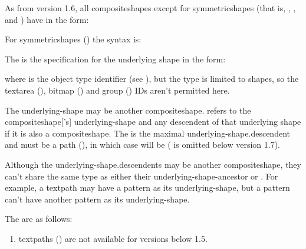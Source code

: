 \begin{numbered}
As from version 1.6, all \glspl{compositeshape} except
for \glspl{symmetricshape} (that is, 
\hyperref[jdr:textpath]{},
\hyperref[jdr:rotational]{},
\hyperref[jdr:scaled]{} and 
\hyperref[jdr:spiral]{}) have  in
the form:
\begin{syntaxline}
 
\end{syntaxline}
For \glspl{symmetricshape} (\hyperref[jdr:symmetric]{}) the syntax is:
\begin{syntaxline}
 
\end{syntaxline}

The  is the specification for the
underlying shape in the form:
\begin{syntaxline}
 
\end{syntaxline}
where  is the object type identifier (see
), but the type is limited to shapes, so the 
\gls*{textarea} (\hyperref[jdr:textarea]{}), 
\gls*{bitmap} (\hyperref[jdr:bitmap]{}) and
\gls*{group} (\hyperref[jdr:group]{}) IDs aren't permitted here.

The \gls{underlying-shape} may be another \gls{compositeshape}.
\emph{} 
refers to the \gls{compositeshape}['s]
\gls{underlying-shape} and any descendent of that underlying shape if it
is also a \gls*{compositeshape}. The
\emph{} is the
maximal \gls{underlying-shape.descendent} and must be a 
\gls*{path} (\hyperref[jdr:path]{}),
in which case   will be
   
( is omitted below version 1.7).

Although the \glspl{underlying-shape.descendent} may be another
\gls*{compositeshape}, they can't share the same type as either
their \gls{underlying-shape-ancestor} or
. For example, a
\gls{textpath} may have a \gls{pattern} as its \gls{underlying-shape}, but
a pattern can't have another pattern as its \gls{underlying-shape}.

The  are as follows:

  \begin{enumerate}%
  \item\label{jdr:textpath}%
  \Glspl{textpath} () are not available for versions below 1.5.


\end{enumerate}
\end{numbered}
